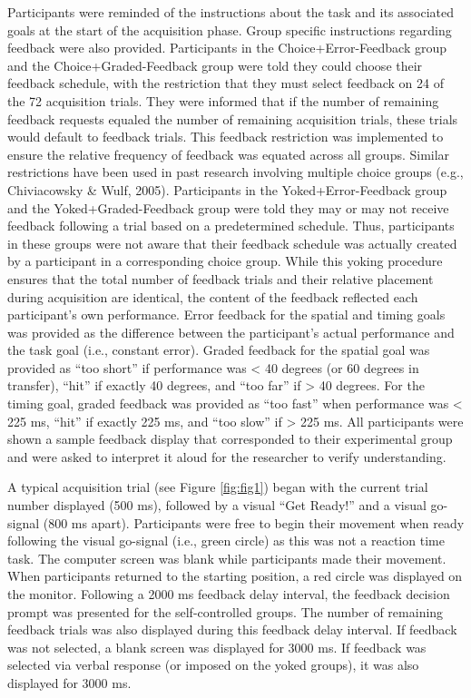 \documentclass[
  man, donotrepeattitle,floatsintext]{apa7}
\begin{document}
Participants were reminded of the instructions about the task and its associated goals at the start of the acquisition phase. Group specific instructions regarding feedback were also provided. Participants in the Choice+Error-Feedback group and the Choice+Graded-Feedback group were told they could choose their feedback schedule, with the restriction that they must select feedback on 24 of the 72 acquisition trials. They were informed that if the number of remaining feedback requests equaled the number of remaining acquisition trials, these trials would default to feedback trials. This feedback restriction was implemented to ensure the relative frequency of feedback was equated across all groups. Similar restrictions have been used in past research involving multiple choice groups (e.g., Chiviacowsky \& Wulf, 2005). Participants in the Yoked+Error-Feedback group and the Yoked+Graded-Feedback group were told they may or may not receive feedback following a trial based on a predetermined schedule. Thus, participants in these groups were not aware that their feedback schedule was actually created by a participant in a corresponding choice group. While this yoking procedure ensures that the total number of feedback trials and their relative placement during acquisition are identical, the content of the feedback reflected each participant's own performance. Error feedback for the spatial and timing goals was provided as the difference between the participant's actual performance and the task goal (i.e., constant error). Graded feedback for the spatial goal was provided as ``too short'' if performance was \textless{} 40 degrees (or 60 degrees in transfer), ``hit'' if exactly 40 degrees, and ``too far'' if \textgreater{} 40 degrees. For the timing goal, graded feedback was provided as ``too fast'' when performance was \textless{} 225 ms, ``hit'' if exactly 225 ms, and ``too slow'' if \textgreater{} 225 ms. All participants were shown a sample feedback display that corresponded to their experimental group and were asked to interpret it aloud for the researcher to verify understanding.

A typical acquisition trial (see Figure \ref{fig:fig1}) began with the current trial number displayed (500 ms), followed by a visual ``Get Ready!'' and a visual go-signal (800 ms apart). Participants were free to begin their movement when ready following the visual go-signal (i.e., green circle) as this was not a reaction time task. The computer screen was blank while participants made their movement. When participants returned to the starting position, a red circle was displayed on the monitor. Following a 2000 ms feedback delay interval, the feedback decision prompt was presented for the self-controlled groups. The number of remaining feedback trials was also displayed during this feedback delay interval. If feedback was not selected, a blank screen was displayed for 3000 ms. If feedback was selected via verbal response (or imposed on the yoked groups), it was also displayed for 3000 ms.
\end{document}
